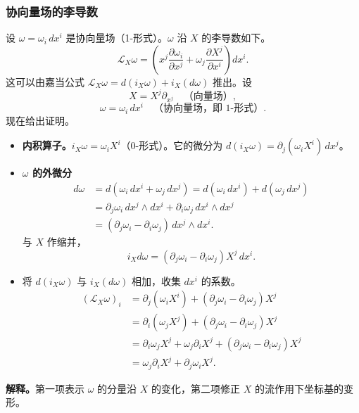 \subsubsection{协向量场的李导数}
设 $\omega=\omega_i\,dx^i$ 是协向量场（1-形式）。$\omega$ 沿 $X$ 的李导数如下。
\[
  \mathcal L_X\omega=
    \left(x^j\frac{\partial\omega_i}{\partial x^j}
         +\omega_j\frac{\partial X^j}{\partial x^i}\right)dx^i.
\]
这可以由嘉当公式 $\mathcal L_X\omega=d(i_X\omega)+i_X(d\omega)$ 推出。设
\[
  X=X^j\partial_{x^j}\quad\text{（向量场）},
\]
\[
  \omega=\omega_i\,dx^i\quad\text{（协向量场，即 1-形式）}.
\]
现在给出证明。
\begin{itemize}
  \item \textbf{内积算子。}$i_X\omega=\omega_iX^i$（0-形式）。它的微分为 $d(i_X\omega)=\partial_j(\omega_iX^i)\,dx^j$。
  \item \textbf{$\omega$ 的外微分}
  \[
    \begin{aligned}
      d\omega&=d(\omega_i\,dx^i+\omega_j\,dx^j)
          =d(\omega_i\,dx^i)+d(\omega_j\,dx^j)\\
        &=\partial_j\omega_i\,dx^j\wedge dx^i
          +\partial_i\omega_j\,dx^i\wedge dx^j\\
        &=(\partial_j\omega_i-\partial_i\omega_j)\,dx^j\wedge dx^i.
    \end{aligned}
  \]
  与 $X$ 作缩并，
  \[
    i_Xd\omega=(\partial_j\omega_i-\partial_i\omega_j)X^j\,dx^i.
  \]
  \item 将 $d(i_X\omega)$ 与 $i_X(d\omega)$ 相加，收集 $dx^i$ 的系数。
  \[
    \begin{aligned}
      (\mathcal L_X\omega)_i
        &=\partial_j(\omega_iX^i)+(\partial_j\omega_i-\partial_i\omega_j)X^j\\
        &=\partial_i(\omega_jX^j)+(\partial_j\omega_i-\partial_i\omega_j)X^j\\
        &=\partial_i\omega_j X^j+\omega_j\partial_iX^j
          +(\partial_j\omega_i-\partial_i\omega_j)X^j\\
        &=\omega_j\partial_iX^j+\partial_j\omega_i X^j.
    \end{aligned}
  \]
\end{itemize}
\textbf{解释。}第一项表示 $\omega$ 的分量沿 $X$ 的变化，第二项修正 $X$ 的流作用下坐标基的变形。

